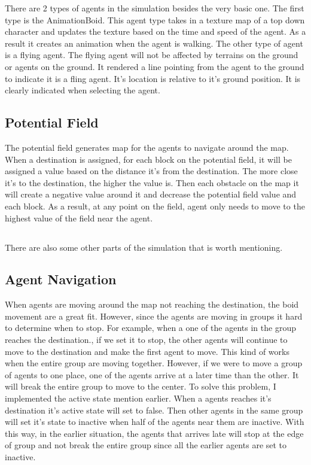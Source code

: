 \documentclass[letterpaper, 12pt]{article}
\begin{document}
There are 2 types of agents in the simulation besides the very basic one. The first type is the AnimationBoid. This agent type takes in a texture map of a top down character and updates the texture based on the time and speed of the agent. As a result it creates an animation when the agent is walking. The other type of agent is a flying agent. The flying agent will not be affected by terrains on the ground or agents on the ground. It rendered a line pointing from the agent to the ground to indicate it is a fling agent. It's location is relative to it's ground position. It is clearly indicated when selecting the agent. 


\subsection*{Potential Field}
The potential field generates map for the agents to navigate around the map. When a destination is assigned, for each block on the potential field, it will be assigned a value based on the distance it's from the destination. The more close it's to the destination, the higher the value is. Then each obstacle on the map it will create a negative value around it and decrease the potential field value and each block. As a result, at any point on the field, agent only needs to move to the highest value of the field near the agent. 

\subsection*{}
There are also some other parts of the simulation that is worth mentioning. 
\subsection*{Agent Navigation}
When agents are moving around the map not reaching the destination, the boid movement are a great fit. However, since the agents are moving in groups it hard to determine when to stop. For example, when a one of the agents in the group reaches the destination., if we set it to stop, the other agents will continue to move to the destination and make the first agent to move. This kind of works when the entire group are moving together. However, if we were to move a group of agents to one place, one of the agents arrive at a later time than the other. It will break the entire group to move to the center. To solve this problem, I implemented the active state mention earlier. When a agents reaches it's destination it's active state will set to false. Then other agents in the same group will set it's state to inactive when half of the agents near them are inactive. With this way, in the earlier situation, the agents that arrives late will stop at the edge of group and not break the entire group since all the earlier agents are set to inactive. 
\end{document}
